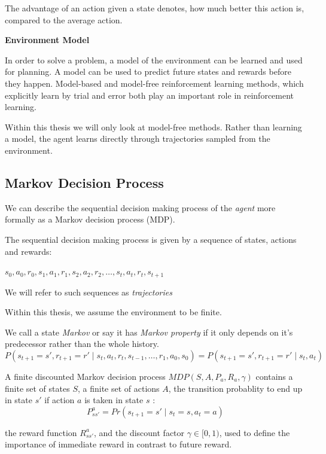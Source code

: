 The advantage of an action given a state denotes, how much better this action is, compared to the average action.

\textbf{Environment Model}

In order to solve a problem, a model of the environment can be learned and used for planning. A model can be used to predict future states and rewards before they happen.
Model-based and model-free reinforcement learning methods, which explicitly learn by trial and error both play an important role in reinforcement learning.

Within this thesis we will only look at model-free methods. Rather than learning a model, the agent learns directly through trajectories sampled from the environment.

\pagebreak

\subsection{Markov Decision Process} 

We can describe the sequential decision making process of the \textit{agent} more formally as a Markov decision process (MDP).

The sequential decision making process is given by a sequence of states, actions and rewards:

$s_0, a_0, r_0, s_1, a_1, r_1, s_2, a_2, r_2, \dots, s_t,a_t,r_t, s_{t+1}$

We will refer to such sequences as \textit{trajectories}

Within this thesis, we assume the environment to be finite.

We call a state \textit{Markov} or say it has \textit{Markov property} if it only depends on it's predecessor rather than the whole history.
\begin{equation}
P(s_{t+1} = s', r_{t+1} = r' \mid s_t, a_t, r_t, s_{t-1}, \dots ,r_1,a_0,s_0) = P(s_{t+1} = s', r_{t+1} = r' \mid s_t,a_t)
\end{equation}

A finite discounted Markov decision process $MDP(S,A,P_a,R_a,\gamma)$ contains a finite set of states $S$, 
a finite set of actions $A$,
the transition probablity to end up in state $s'$ if action $a$ is taken in state $s$ : 
\begin{equation}
P^a_{s s'} = Pr(s_{t+1} = s' \mid s_t = s, a_t = a)
\end{equation}

the reward function $R^a_{s s'}$,
and the discount factor $\gamma  \in [0,1)$, used to define the importance of immediate reward in contrast to future reward. 

